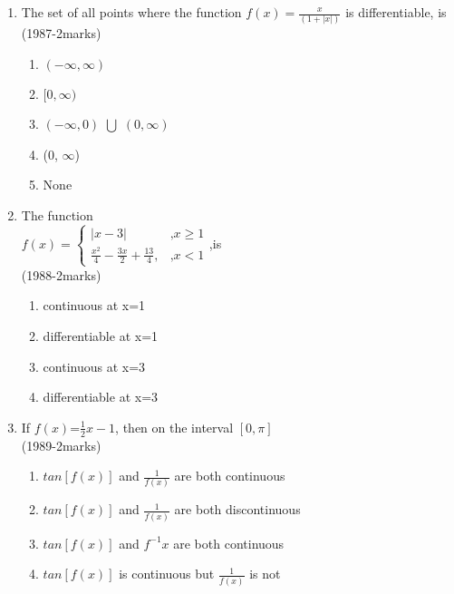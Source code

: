 \documentclass[journal,12pt,twocolumn]{IEEEtran}
\theoremstyle{remark}
\begin{document}
\begin{enumerate}
\item The set of all points where the function $f(x)=\frac{x}{(1+|x|)}$ is differentiable, is \\
\hfill{(1987-2marks)} 

\begin{enumerate}
    \item \((- \infty, \infty)\)
    \item \([0, \infty)\)
    \item \((- \infty,0)\) $\bigcup$ \((0, \infty)\)
    \item (0, $\infty$)
    \item None \\
\end{enumerate}
\item The function \\ $f(x)=\begin{cases}|x-3| & \text{,} x \geq 1 \\
    \frac{x^2}{4}-\frac{3x}{2}+\frac{13}{4}, & \text{,} x<1 
\end{cases}$,is \\ \hfill{(1988-2marks)} 
\begin{enumerate}
    \item continuous at x=1
    \item differentiable at x=1
    \item continuous at x=3
    \item differentiable at x=3 \\ 
\end{enumerate}
\item If $f(x)$=$\frac{1}{2}x-1$, then on the interval $[0,\pi]$ \\ \hfill{(1989-2marks)} 
\begin{enumerate}
    \item $tan[f(x)]$ and $\frac{1}{f(x)}$ are both continuous
    \item $tan[f(x)]$ and $\frac{1}{f(x)}$ are both discontinuous
    \item $tan[f(x)]$ and $f^{-1}x$ are both continuous
    \item $tan[f(x)]$ is continuous but $\frac{1}{f(x)}$ is not \\
\end{enumerate}


\end{enumerate}
\end{document}
